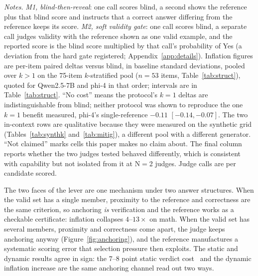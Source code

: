 \documentclass[11pt]{article}
\begin{document}
\begin{table}[tbp]
\medskip
\begin{minipage}{0.97\textwidth}
\footnotesize
\emph{Notes.}
\emph{M1, blind-then-reveal}: one call scores blind, a second shows the reference plus that blind score and instructs that a correct answer differing from the reference keeps its score.
\emph{M2, soft validity gate}: one call scores blind, a separate call judges validity with the reference shown as one valid example, and the reported score is the blind score multiplied by that call's probability of Yes (a deviation from the hard gate registered; Appendix~\ref{app:details}).
Inflation figures are per-item paired deltas versus blind, in baseline standard deviations, pooled over $k > 1$ on the 75-item $k$-stratified pool ($n{=}53$ items, Table~\ref{tab:struct}), quoted for Qwen2.5-7B and phi-4 in that order; intervals are in Table~\ref{tab:struct}.
``No cost'' means the protocol's $k{=}1$ deltas are indistinguishable from blind; neither protocol was shown to reproduce the one $k{=}1$ benefit measured, phi-4's single-reference $-0.11$ $[-0.14, -0.07]$.
The two in-context rows are qualitative because they were measured on the synthetic grid (Tables~\ref{tab:synthk} and~\ref{tab:mitig}), a different pool with a different generator.
``Not claimed'' marks cells this paper makes no claim about.
The final column reports whether the two judges tested behaved differently, which is consistent with capability but not isolated from it at N$=$2 judges.
Judge calls are per candidate scored.
\end{minipage}
\caption{\textbf{Takeaway: score blind first and reveal the reference only to correct demonstrated errors (M1). Of the protocols tested, it is the only one that keeps a reference in the loop, removes the measured inflation when several answers are valid, costs nothing when the answer is unique, and behaves the same for both judges tested. The price is one extra judge call per candidate.}
What to do about a reference answer, by task structure.}
\label{tab:rule}
\end{table}

The two faces of the lever are one mechanism under two answer structures.
When the valid set has a single member, proximity to the reference and correctness are the same criterion, so anchoring \emph{is} verification and the reference works as a checkable certificate: inflation collapses $4$--$13\times$ on math.
When the valid set has several members, proximity and correctness come apart, the judge keeps anchoring anyway (Figure~\ref{fig:anchoring}), and the reference manufactures a systematic scoring error that selection pressure then exploits.
The static and dynamic results agree in sign: the $7$--$8$ point static verdict cost~\cite{companionA} and the dynamic inflation increase are the same anchoring channel read out two ways.
\end{document}

